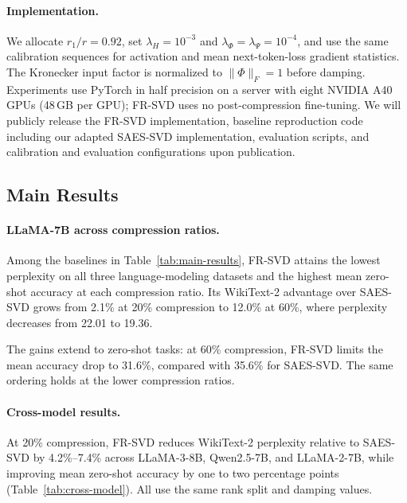 \documentclass[11pt]{article}
\begin{document}
\paragraph{Implementation.}
We allocate $r_1/r=0.92$, set $\lambda_H=10^{-3}$ and $\lambda_\Phi=\lambda_\Psi=10^{-4}$, and use the same calibration sequences for activation and mean next-token-loss gradient statistics. The Kronecker input factor is normalized to $\|\Phi\|_F=1$ before damping. Experiments use PyTorch in half precision on a server with eight NVIDIA A40 GPUs (48\,GB per GPU); FR-SVD uses no post-compression fine-tuning. We will publicly release the FR-SVD implementation, baseline reproduction code including our adapted SAES-SVD implementation, evaluation scripts, and calibration and evaluation configurations upon publication.


\subsection{Main Results}\label{sec:main-results-llama7b}



\paragraph{LLaMA-7B across compression ratios.}

Among the baselines in Table~\ref{tab:main-results}, FR-SVD attains the lowest perplexity on all three language-modeling datasets and the highest mean zero-shot accuracy at each compression ratio. Its WikiText-2 advantage over SAES-SVD grows from 2.1\% at 20\% compression to 12.0\% at 60\%, where perplexity decreases from 22.01 to 19.36.

The gains extend to zero-shot tasks: at 60\% compression, FR-SVD limits the mean accuracy drop to 31.6\%, compared with 35.6\% for SAES-SVD. The same ordering holds at the lower compression ratios.

\paragraph{Cross-model results.}

At 20\% compression, FR-SVD reduces WikiText-2 perplexity relative to SAES-SVD by 4.2\%--7.4\% across LLaMA-3-8B, Qwen2.5-7B, and LLaMA-2-7B, while improving mean zero-shot accuracy by one to two percentage points (Table~\ref{tab:cross-model}). All use the same rank split and damping values.
\end{document}
